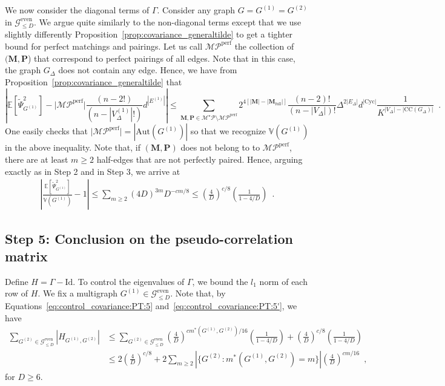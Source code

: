 \documentclass{article}
\begin{document}
We now consider the diagonal terms of $\Gamma$. Consider any graph $G=G^{(1)} = G^{(2)}$ in $\mathcal{G}_{\leq D}^{\mathrm{even}}$. We argue quite similarly to the non-diagonal terms except that we use slightly differently Proposition~\ref{prop:covariance_generaltilde} to get a tighter bound for perfect matchings and pairings. Let us call $\mathcal{MP}^{\mathrm{perf}}$ the collection of $(\mathbf{M},\mathbf{P}$) that correspond to perfect pairings of all edges. Note that in this case, the graph $G_{\Delta}$ does not contain any edge. Hence, we have from Proposition~\ref{prop:covariance_generaltilde} that 
\begin{equation}\label{eq:upper_variance}
\left|\mathbb{E}[\widetilde{\Psi}^2_{G^{(1)}}] -  \big|\mathcal{MP}^{\mathrm{perf}}\big|\frac{(n-2!)}{(n-|V_{\Delta}^{(1)}|!)}d^{|E^{(1)}|} \right|\leq  \sum_{\mathbf{M},\mathbf{P}\in \mathcal{M}^{\star}\mathcal{P}\setminus \mathcal{MP}^{\mathrm{perf}}}  2^{4[|\mathbf M|- |\mathbf M_{\mathrm{full}}|]} \frac{(n-2)!}{(n-|V_{\Delta}|)!} \Delta^{2|E_{\Delta}|}d^{|\mathrm{Cyc}|}\frac{1}{K^{|V_{\Delta}|-|\mathrm{CC}(G_{\Delta})|}} \enspace .
\end{equation}
One easily checks that $\big|\mathcal{MP}^{\mathrm{perf}}\big|= |\mathrm{Aut}(G^{(1)})|$ so that we recognize $\mathbb{V}(G^{(1)})$ in the above inequality. Note that, if $(\mathbf{M},\mathbf{P})$ does not belong to to $\mathcal{MP}^{\mathrm{perf}}$, there are at least $m\geq 2$ half-edges that are not perfectly paired. Hence, arguing exactly as in Step 2 and in Step 3, we arrive at 
\begin{eqnarray}\label{eq:control_covariance:PT:5'}
\left|\frac{ \mathbb{E}[\widetilde{\Psi}^2_{G^{(1)}}]}{\mathbb{V}(G^{(1)})} -1 \right| \leq   \sum_{m\geq 2} (4D)^{3m} D^{-cm/8} \leq  \left(\frac{4}{D}\right)^{c/8}\left(\frac{1}{1- 4/D}\right) \enspace . 
\end{eqnarray}



\subsection{Step 5: Conclusion on the pseudo-correlation matrix}

Define $H = \Gamma - \mathrm{Id}$. To control the eigenvalues of $\Gamma$, we bound the $l_1$ norm of each row of $H$.
We fix a multigraph $G^{(1)} \in \mathcal G_{\leq D}^{\mathrm{even}}$. Note that, by Equations~\eqref{eq:control_covariance:PT:5} and~\eqref{eq:control_covariance:PT:5'}, we have
\begin{align*}
    \sum_{G^{(2)} \in \mathcal G_{\leq D}^{\mathrm{even}}}\left|H_{G^{(1)}, G^{(2)}}\right|
    &\leq \sum_{G^{(2)} \in \mathcal G_{\leq D}^{\mathrm{even}}} \left(\frac{4}{D}\right)^{cm^*( G^{(1)},  G^{(2)})/16} \left(\frac{1}{1- 4/D}\right)+ \left(\frac{4}{D}\right)^{c/8}\left(\frac{1}{1- 4/D}\right)\\
    &\leq 2  \left(\frac{4}{D}\right)^{c/8}+ 2\sum_{m\geq 2} |\{G^{(2)}: m^*( G^{(1)}, G^{(2)}) = m\}| \left(\frac{4}{D}\right)^{cm/16}\enspace ,
\end{align*}
for $D \geq 6$. 
\end{document}
